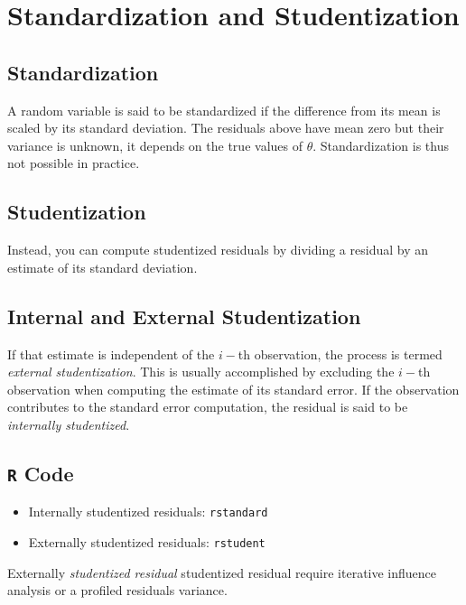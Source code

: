 \documentclass[residuals.tex]{subfiles}
\begin{document}
\Large



\section{Standardization and Studentization}
\subsection{Standardization} %

A random variable is said to be standardized if the difference from its mean is scaled by its standard deviation. 
The residuals above have mean zero but their variance is unknown, it depends on the true values of $\theta$. Standardization is thus not possible in practice.

\subsection{Studentization} %
Instead, you can compute studentized residuals by dividing a residual by an estimate of its standard deviation. 

\subsection{Internal and External Studentization} %
If that estimate is independent of the $i-$th observation, the process is termed \emph{external studentization}. 
This is usually accomplished by excluding the $i-$th observation when computing the estimate of its standard error. If the observation contributes to the
standard error computation, the residual is said to be \emph{internally studentized}.


\subsection*{\texttt{R} Code}
\begin{itemize}
\item Internally studentized residuals: \texttt{rstandard}
\item Externally studentized residuals: \texttt{rstudent}
\end{itemize}
Externally \emph{studentized residual} studentized residual require iterative influence analysis or a profiled residuals variance.
\end{document}
